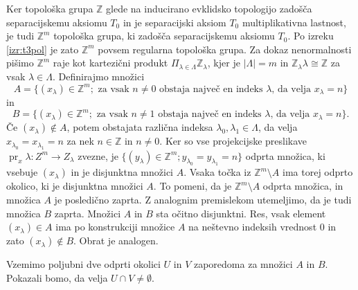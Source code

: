 \documentclass[mat1]{fmfdelo}
\newcommand{\Z}{\mathbb Z}
\DeclareMathOperator{\pr}{pr}
\begin{document}
\begin{dokaz}
Ker topološka grupa $\Z$ glede na inducirano evklidsko topologijo zadošča separacijskemu aksiomu $T_0$ in je separacijski aksiom $T_0$ multiplikativna lastnost, je tudi $\Z^m$ topološka grupa, ki zadošča separacijskemu aksiomu $T_0$. Po izreku \ref{izr:t3pol} je zato $\Z^m$ povsem regularna topološka grupa. Za dokaz nenormalnosti pišimo $\Z^m$ raje kot kartezični produkt $\Pi_{\lambda \in \Lambda}\Z_\lambda$, kjer je $|\Lambda| = m$ in $\Z_\lambda\lambda \cong \Z$ za vsak $\lambda \in \Lambda$. Definirajmo množici
\[ A = \lbrace (x_\lambda) \in \Z^m ; \text{ za vsak $n \neq 0$ obstaja največ en indeks $\lambda$, da velja $x_\lambda = n$}\rbrace \]
in
\[ B = \lbrace (x_\lambda) \in \Z^m ; \text{ za vsak $n \neq 1$ obstaja največ en indeks $\lambda$, da velja $x_\lambda = n$}\rbrace. \]
Če $(x_\lambda) \notin A$, potem obstajata različna indeksa $\lambda_0, \lambda_1 \in \Lambda$, da velja $x_{\lambda_0} = x_{\lambda_1} = n$ za nek $n \in \Z$ in $n \neq 0$. Ker so vse projekcijske preslikave $\pr_x\lambda\colon Z^m \to Z_\lambda$ zvezne, je $\lbrace (y_\lambda) \in \Z^m ; y_{\lambda_0} = y_{\lambda_1} = n \rbrace$ odprta množica, ki vsebuje $(x_\lambda)$ in je disjunktna množici $A$. Vsaka točka iz $\Z^m\setminus A$ ima torej odprto okolico, ki je disjunktna množici $A$. To pomeni, da je $\Z^m\setminus A$ odprta množica, in množica $A$ je posledično zaprta. Z analognim premislekom utemeljimo, da je tudi množica $B$ zaprta. Množici $A$ in $B$ sta očitno disjunktni. Res, vsak element $(x_\lambda) \in A$ ima po konstrukciji množice $A$ na neštevno indeksih vrednost $0$ in zato $(x_\lambda) \notin B$. Obrat je analogen.

Vzemimo poljubni dve odprti okolici $U$ in $V$ zaporedoma za množici $A$ in $B$. Pokazali bomo, da velja $U \cap V \neq \emptyset$.


\end{dokaz}
\end{document}
